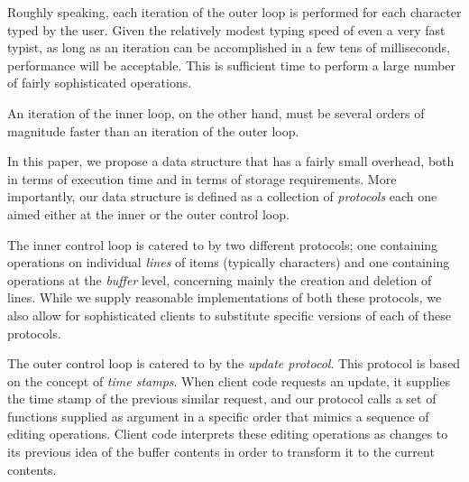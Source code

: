 Roughly speaking, each iteration of the outer loop is performed for
each character typed by the user.  Given the relatively modest typing
speed of even a very fast typist, as long as an iteration can be
accomplished in a few tens of milliseconds, performance will be
acceptable.  This is sufficient time to perform a large number of
fairly sophisticated operations.

An iteration of the inner loop, on the other hand, must be several
orders of magnitude faster than an iteration of the outer loop.

In this paper, we propose a data structure that has a fairly small
overhead, both in terms of execution time and in terms of storage
requirements.  More importantly, our data structure is defined as a
collection of \clos{} \emph{protocols} each one aimed either at the
inner or the outer control loop.

The inner control loop is catered to by two different protocols; one
containing operations on individual \emph{lines} of items (typically
characters) and one containing operations at the \emph{buffer} level,
concerning mainly the creation and deletion of lines.  While we supply
reasonable implementations of both these protocols, we also allow for
sophisticated clients to substitute specific versions of each of these
protocols.

The outer control loop is catered to by the \emph{update protocol}.
This protocol is based on the concept of \emph{time stamps}.  When
client code requests an update, it supplies the time stamp of the
previous similar request, and our protocol calls a set of functions
supplied as argument in a specific order that mimics a sequence of
editing operations.  Client code interprets these editing operations
as changes to its previous idea of the buffer contents in order to
transform it to the current contents.


